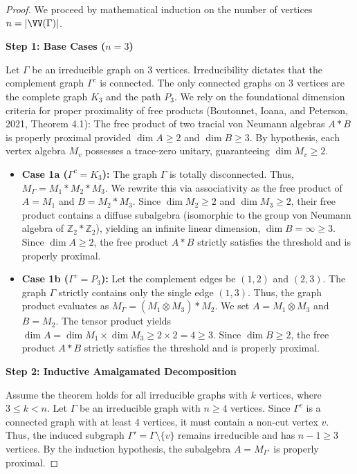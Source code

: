 \begin{proof}
We proceed by mathematical induction on the number of vertices $n = |\VV(\Gamma)|$. 

\medskip\noindent\textbf{Step 1: Base Cases ($n=3$)}

Let $\Gamma$ be an irreducible graph on 3 vertices. Irreducibility dictates that the complement graph $\Gamma^c$ is connected. The only connected graphs on 3 vertices are the complete graph $K_3$ and the path $P_3$. 
We rely on the foundational dimension criteria for proper proximality of free products (Boutonnet, Ioana, and Peterson, 2021, Theorem 4.1): The free product of two tracial von Neumann algebras $A \ast B$ is properly proximal provided $\dim A \ge 2$ and $\dim B \ge 3$. By hypothesis, each vertex algebra $M_v$ possesses a trace-zero unitary, guaranteeing $\dim M_v \ge 2$.
\begin{itemize}
    \item \textbf{Case 1a ($\Gamma^c = K_3$):} The graph $\Gamma$ is totally disconnected. Thus, $M_\Gamma = M_1 \ast M_2 \ast M_3$. We rewrite this via associativity as the free product of $A = M_1$ and $B = M_2 \ast M_3$. Since $\dim M_2 \ge 2$ and $\dim M_3 \ge 2$, their free product contains a diffuse subalgebra (isomorphic to the group von Neumann algebra of $\mathbb{Z}_2 \ast \mathbb{Z}_2$), yielding an infinite linear dimension, $\dim B = \infty \ge 3$. Since $\dim A \ge 2$, the free product $A \ast B$ strictly satisfies the threshold and is properly proximal.
    
    \item \textbf{Case 1b ($\Gamma^c = P_3$):} Let the complement edges be $(1,2)$ and $(2,3)$. The graph $\Gamma$ strictly contains only the single edge $(1,3)$. Thus, the graph product evaluates as $M_\Gamma = (M_1 \overline{\otimes} M_3) \ast M_2$. We set $A = M_1 \overline{\otimes} M_3$ and $B = M_2$. The tensor product yields $\dim A = \dim M_1 \times \dim M_3 \ge 2 \times 2 = 4 \ge 3$. Since $\dim B \ge 2$, the free product $A \ast B$ strictly satisfies the threshold and is properly proximal.
\end{itemize}

\medskip\noindent\textbf{Step 2: Inductive Amalgamated Decomposition}

Assume the theorem holds for all irreducible graphs with $k$ vertices, where $3 \le k < n$. Let $\Gamma$ be an irreducible graph with $n \ge 4$ vertices. Since $\Gamma^c$ is a connected graph with at least 4 vertices, it must contain a non-cut vertex $v$. Thus, the induced subgraph $\Gamma' = \Gamma \setminus \{v\}$ remains irreducible and has $n-1 \ge 3$ vertices. By the induction hypothesis, the subalgebra $A = M_{\Gamma'}$ is properly proximal.


\end{proof}
